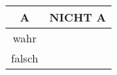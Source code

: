 \documentclass[ngerman, 11pt]{scrreprt}
\begin{document}
\begin{aufgabe*}
\begin{enumerate}[label=\alph*), itemsep=0ex, parsep=0ex]
			\medskip
			\begin{minipage}{0.4\textwidth}
				
			\end{minipage}
			\hfill
			\begin{minipage}{0.4\textwidth}
				\centering
				\begin{tabular}{c | c}
					\textbf{A}  & \textbf{NICHT A} \\ \hline
					wahr &  \\
					falsch &  \\  
				\end{tabular}
			\end{minipage}
			\hfill
		\end{enumerate}
	\end{aufgabe*}
	
	
	
\end{document}
